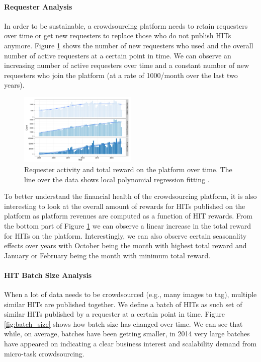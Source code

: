 \paragraph{Requester Analysis}
In order to be sustainable, a crowdsourcing platform needs to retain requesters over time or get new requesters to replace those who do not publish HITs anymore. Figure \ref{fig:requesters_reward} shows the number of new requesters who used \amt{} and the overall number of active requesters at a certain point in time. We can observe an increasing number of active requesters over time and a constant number of new requesters who join the platform (at a rate of 1000/month over the last two years).

\begin{figure}[ht]
	\centering
		\includegraphics[width=0.5\textwidth]{figures/requesters_reward}
	\caption{Requester activity and total reward on the platform over time. The line over the data shows local polynomial regression fitting \cite{cleveland1992local}.}
	\label{fig:requesters_reward}
\end{figure}

To better understand the financial health of the crowdsourcing platform, it is also interesting to look at the overall amount of rewards for HITs  published on the platform as platform revenues are computed as a  function of  HIT rewards. From the bottom part of Figure \ref{fig:requesters_reward} we can  observe a linear increase in the total reward for HITs on the platform. Interestingly, we can also observe certain seasonality effects over years with October being the month with highest total reward and January or February being the month with minimum total reward.


\paragraph{HIT Batch Size Analysis}
When a lot of data needs to be crowdsourced (e.g., many images to tag), multiple similar HITs are published together. We define a batch of HITs as such set of similar HITs published by a requester at a certain point in time. Figure \ref{fig:batch_size} shows how  batch size has changed over time.
We can see that while, on average, batches have been getting smaller, in 2014 very large batches have appeared on \amt{} indicating a clear business interest and scalability demand from micro-task crowdsourcing.

